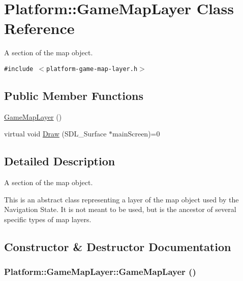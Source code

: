 \hypertarget{class_platform_1_1_game_map_layer}{
\section{Platform::GameMapLayer Class Reference}
\label{d8/d53/class_platform_1_1_game_map_layer}
}
A section of the map object.  


{\tt \#include $<$platform-game-map-layer.h$>$}

\subsection*{Public Member Functions}
\begin{CompactItemize}
\item 
\hyperlink{class_platform_1_1_game_map_layer_d85a59798bab4ca39175e9d118969daa}{GameMapLayer} ()
\item 
virtual void \hyperlink{class_platform_1_1_game_map_layer_8f800165e53a408dfad459f3533ed0a9}{Draw} (SDL\_\-Surface $\ast$mainScreen)=0
\end{CompactItemize}


\subsection{Detailed Description}
A section of the map object. 

This is an abstract class representing a layer of the map object used by the Navigation State. It is not meant to be used, but is the ancestor of several specific types of map layers. 

\subsection{Constructor \& Destructor Documentation}
\hypertarget{class_platform_1_1_game_map_layer_d85a59798bab4ca39175e9d118969daa}{
\subsubsection[{GameMapLayer}]{\setlength{\rightskip}{0pt plus 5cm}Platform::GameMapLayer::GameMapLayer ()}}
\label{d8/d53/class_platform_1_1_game_map_layer_d85a59798bab4ca39175e9d118969daa}




